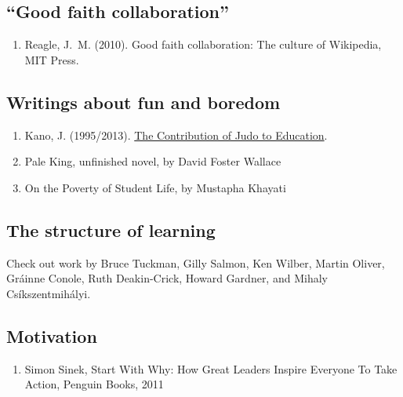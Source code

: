 \hypertarget{good-faith-collaboration}{%
\subsection{``Good faith
collaboration''}\label{good-faith-collaboration}}

\begin{enumerate}
\def\labelenumi{\arabic{enumi}.}
\tightlist
\item
  Reagle, J.~M. (2010). Good faith collaboration: The culture of
  Wikipedia, MIT Press.
\end{enumerate}

\hypertarget{writings-about-fun-and-boredom}{%
\subsection{Writings about fun and
boredom}\label{writings-about-fun-and-boredom}}

\begin{enumerate}
\def\labelenumi{\arabic{enumi}.}
\item
  Kano, J. (1995/2013). \href{http://judoinfo.com/kano.htm}{The
  Contribution of Judo to Education}.
\item
  Pale King, unfinished novel, by David Foster Wallace
\item
  On the Poverty of Student Life, by Mustapha Khayati
\end{enumerate}

\hypertarget{the-structure-of-learning}{%
\subsection{The structure of learning}\label{the-structure-of-learning}}

Check out work by Bruce Tuckman, Gilly Salmon, Ken Wilber, Martin
Oliver, Gráinne Conole, Ruth Deakin-Crick, Howard Gardner, and Mihaly
Csíkszentmihályi.

\hypertarget{motivation}{%
\subsection{Motivation}\label{motivation}}

\begin{enumerate}
\def\labelenumi{\arabic{enumi}.}
\tightlist
\item
  Simon Sinek, Start With Why: How Great Leaders Inspire Everyone To
  Take Action, Penguin Books, 2011
\end{enumerate}

